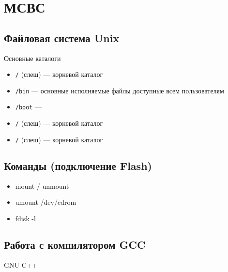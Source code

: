 \section{МСВС}


\subsection{Файловая система Unix}

\begin{frame}[t]{Основные каталоги}
  \begin{itemize}
     \item \texttt{/} (слеш) --- корневой каталог
     \item \texttt{/bin} --- основные исполняемые файлы доступные всем пользователям
     \item \texttt{/boot} --- 
     \item \texttt{/} (слеш) --- корневой каталог
     \item \texttt{/} (слеш) --- корневой каталог
  \end{itemize}
\end{frame}

\subsection{Команды (подключение Flash)}

\begin{frame}[t]{}
  \begin{itemize}
    \item mount / unmount
    \item umount /dev/cdrom
    \item fdisk -l
  \end{itemize}
\end{frame}

\subsection{Работа с компилятором GCC}

\begin{frame}[t]{}
   GNU C++ 

\end{frame}